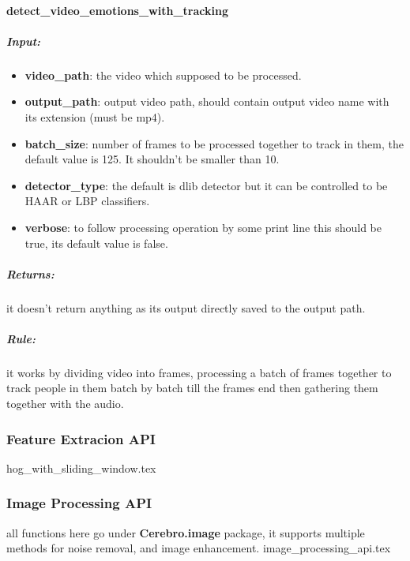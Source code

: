 \paragraph{detect\_video\_emotions\_with\_tracking}
\subparagraph{Input:}
\begin{changemargin}{0.5cm}{0cm} 
\begin{itemize}
	\item  \textbf{video\_path}: the video which supposed to be processed.
	\item  \textbf{output\_path}: output video path, should contain output video name with its extension (must be mp4).
	\item  \textbf{batch\_size}: number of frames to be processed together to track in them, the default value is 125. \newline It shouldn't be smaller than 10.
	\item \textbf{detector\_type}: the default is dlib detector but it can be controlled to be HAAR or LBP classifiers.
	\item  \textbf{verbose}: to follow processing operation by some print line this should be true, its default value is false.
\end{itemize}
\end{changemargin}

\subparagraph{Returns:}
\begin{changemargin}{0.5cm}{}
	it doesn't return anything as its output directly saved to the output path.
\end{changemargin}


\subparagraph{Rule:}
\begin{changemargin}{0.5cm}{}
it works by dividing video into frames, processing a batch of frames together to track people in them batch by batch till the frames end then gathering them together with the audio.
\end{changemargin}

\subsubsection{Feature Extracion API}
{hog_with_sliding_window.tex}

\subsubsection{Image Processing API}
all functions here go under \textbf{Cerebro.image} package, it supports multiple methods for noise removal, and image enhancement. 
{image_processing_api.tex}